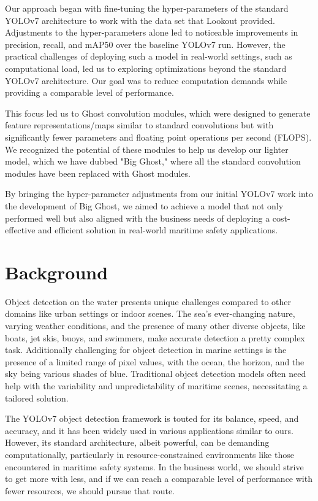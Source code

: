 \documentclass[sigplan,nonacm]{acmart}
\begin{document}
Our approach began with fine-tuning the hyper-parameters of the standard YOLOv7 architecture to work with the data set that Lookout provided. Adjustments to the hyper-parameters alone led to noticeable improvements in precision, recall, and mAP50 over the baseline YOLOv7 run. However, the practical challenges of deploying such a model in real-world settings, such as computational load, led us to exploring optimizations beyond the standard YOLOv7 architecture. Our goal was to reduce computation demands while providing a comparable level of performance. 

This focus led us to Ghost convolution modules, which were designed to generate feature representations/maps similar to standard convolutions but with significantly fewer parameters and floating point operations per second (FLOPS). We recognized the potential of these modules to help us develop our lighter model, which we have dubbed "Big Ghost," where all the standard convolution modules have been replaced with Ghost modules. 

By bringing the hyper-parameter adjustments from our initial YOLOv7 work into the development of Big Ghost, we aimed to achieve a model that not only performed well but also aligned with the business needs of deploying a cost-effective and efficient solution in real-world maritime safety applications. 

\section*{Background}
Object detection on the water presents unique challenges compared to other domains like urban settings or indoor scenes. The sea's ever-changing nature, varying weather conditions, and the presence of many other diverse objects, like boats, jet skis, buoys, and swimmers, make accurate detection a pretty complex task. Additionally challenging for object detection in marine settings is the presence of a limited range of pixel values, with the ocean, the horizon, and the sky being various shades of blue. Traditional object detection models often need help with the variability and unpredictability of maritime scenes, necessitating a tailored solution. 

The YOLOv7 object detection framework is touted for its balance, speed, and accuracy, and it has been widely used in various applications similar to ours. However, its standard architecture, albeit powerful, can be demanding computationally, particularly in resource-constrained environments like those encountered in maritime safety systems. In the business world, we should strive to get more with less, and if we can reach a comparable level of performance with fewer resources, we should pursue that route. 
\end{document}
